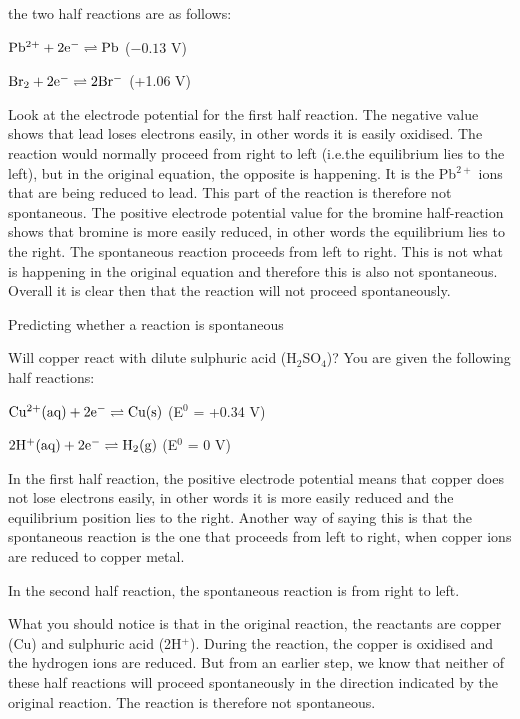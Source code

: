 the two half reactions are as follows:

\begin{center}
$\rm{Pb^{2+} + 2e^{-} \rightleftharpoons Pb}$ ($-0.13$ V)

$\rm{Br_{2} + 2e^{-} \rightleftharpoons 2Br^{-}}$ (+1.06 V)
\end{center}


Look at the electrode potential for the first half reaction. The negative value shows that lead loses electrons easily, in other words it is easily oxidised. The reaction would normally proceed from right to left (i.e.\@ the equilibrium lies to the left), but in the original equation, the opposite is happening. It is the Pb$^{2+}$ ions that are being reduced to lead. This part of the reaction is therefore not spontaneous. The positive electrode potential value for the bromine half-reaction shows that bromine is more easily reduced, in other words the equilibrium lies to the right. The spontaneous reaction proceeds from left to right. This is not what is happening in the original equation and therefore this is also not spontaneous. Overall it is clear then that the reaction will not proceed spontaneously.

\begin{wex}{Predicting whether a reaction is spontaneous}{Will copper react with dilute sulphuric acid (H$_{2}$SO$_{4}$)? You are given the following half reactions:

\begin{center}
$\rm{Cu^{2+}(aq) + 2e^{-} \rightleftharpoons Cu(s)}$ (E$^{0}$ = +0.34 V)

$\rm{2H^{+}(aq) + 2e^{-} \rightleftharpoons H_{2}(g)}$ (E$^{0}$ = 0 V)
\end{center} 
}
{
In the first half reaction, the positive electrode potential means that copper does not lose electrons easily, in other words it is more easily reduced and the equilibrium position lies to the right. Another way of saying this is that the spontaneous reaction is the one that proceeds from left to right, when copper ions are reduced to copper metal.

In the second half reaction, the spontaneous reaction is from right to left.


What you should notice is that in the original reaction, the reactants are copper (Cu) and sulphuric acid (2H$^{+}$). During the reaction, the copper is oxidised and the hydrogen ions are reduced. But from an earlier step, we know that neither of these half reactions will proceed spontaneously in the direction indicated by the original reaction. The reaction is therefore not spontaneous.
}
\end{wex} 

